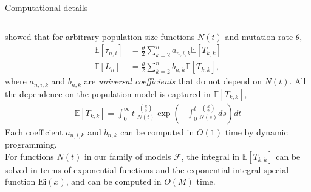 \documentclass[final,hyperref={pdfpagelabels=false},professionalfonts,mathserif]{beamer}
\def\bbE{\mathbb{E}}
\def\cF{\mathcal{F}}
\begin{document}
\begin{frame}[fragile]
\begin{columns}[t]
\begin{column}{.495\linewidth}
		
		\begin{block}{\large Computational details}
			\begin{columns}[T]
			\begin{column}{.97\linewidth}
			\vspace{-0.5cm}
			\citet{polanski:2003-1} showed that for arbitrary population size functions $N(t)$ and mutation rate $\theta$,
			\vspace{-0.8cm}
			\begin{align*}
				\bbE[\tau_{n,i}] &= \frac{\theta}{2} \sum_{k=2}^{n} a_{n,i,k} \bbE[T_{k,k}]	\\
				\bbE[L_n] &= \frac{\theta}{2} \sum_{k=2}^{n} b_{n,k} \bbE[T_{k,k}],
			\end{align*}
			where $a_{n,i,k}$ and $b_{n,k}$ are \emph{universal coefficients} that do not depend on $N(t)$. All the dependence on the population model is captured in $\bbE[T_{k,k}]$,
			\begin{align*}
				\bbE[T_{k,k}] = \int_0^{\infty} t ~\frac{\binom{k}{2}}{N(t)} \exp \left( - \int_0^t \frac{\binom{k}{2}}{N(s)} ds \right) dt
			\end{align*}
			Each coefficient $a_{n,i,k}$ and $b_{n,k}$ can be computed in $O(1)$ time by dynamic programming. \\
			For functions $N(t)$ in our family of models $\cF$, the integral in $\bbE[T_{k,k}]$ can be solved in terms of exponential functions and the exponential integral special function $\textrm{Ei}(x)$, and can be computed in $O(M)$ time.
			\end{column}
			\end{columns}
		\end{block}


\end{column}
\end{columns}
\end{frame}
\end{document}
